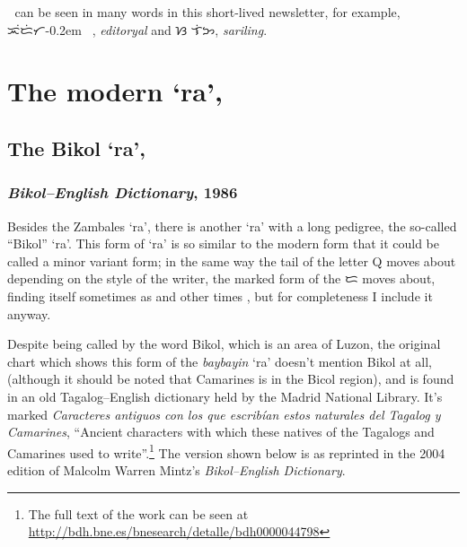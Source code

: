 \documentclass[a4paper,pagesize,openany,14pt,parskip=never]{scrbook}
\newcommand{\≈}{$\approx$}
\begin{document}
{\baybayinh ᜍ} can be seen in many words in this short-lived newsletter, for example, {\baybayinh ᜁᜒᜇᜒᜆ\kern-0.2emᜍᜌᜎ}, {\em editoryal} and {\baybayinh ᜐᜍᜒᜎᜒᜅ}, {\em sariling}.

\newpage
\section{The modern `ra', {\baybayin ᜍ}}
\subsection{The Bikol `ra', {\baybayinb {} } }
\label{BikolRa}
\subsubsection{{\em Bikol--English Dictionary}, 1986}
\label{BED}

Besides the Zambales `ra', there is another `ra' with a long pedigree, the so-called ``Bikol'' `ra'. This form of `ra' is so similar to the modern form that it could be called a minor variant form; in the same way the tail of the letter Q moves about depending on the style of the writer, the marked form of the {\baybayin ᜇ} moves about, finding itself sometimes as {\baybayinb {}} and other times {\baybayin {}}, but for completeness I include it anyway.

%    

Despite being called by the word Bikol, which is an area of Luzon, the original chart which shows this form of the {\em baybayin} `ra' doesn't mention Bikol at all, (although it should be noted that Camarines is in the Bicol region), and is found in an old Tagalog--English dictionary held by the Madrid National Library. It's marked {\em Caracteres antiguos con los que escribían estos naturales del Tagalog y Camarines}, ``Ancient characters with which these natives of the Tagalogs and Camarines used to write''.\footnote{The full text of the work can be seen at \url{http://bdh.bne.es/bnesearch/detalle/bdh0000044798}} The version shown below is as reprinted in the 2004 edition of Malcolm Warren Mintz's {\em Bikol--English Dictionary}.
\end{document}
